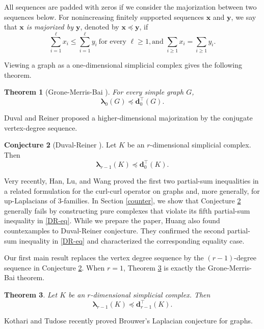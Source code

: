 \documentclass[12pt]{amsart}
\theoremstyle{plain}
\newtheorem{thm}{Theorem}[section]
\theoremstyle{definition}
\newtheorem{conj}[thm]{Conjecture}
\numberwithin{equation}{section}
\numberwithin{figure}{section}
\newcommand{\bflam}{\bm{\lambda}}
\newcommand{\dd}{\mathbf d}
\newcommand{\pre}{\preccurlyeq}
\begin{document}
All sequences are padded with zeros if we consider the majorization between two sequences below.
For nonincreasing finitely supported sequences $\mathbf{x}$ and $\mathbf{y}$, we say that \emph{$\mathbf{x}$ is majorized by $\mathbf{y}$}, denoted by $\mathbf{x} \pre \mathbf{y}$, if
\[
\sum_{i = 1}^{\ell} x_i \leq \sum_{i = 1}^{\ell} y_i
~ \text{for every $\ell \geq 1$},
 \text{and~}
\sum_{i \geq 1} x_i = \sum_{i \geq 1} y_i.
\]

Viewing a graph as a one-dimensional simplicial complex gives the following theorem.

\begin{thm}[Grone-Merris-Bai \cite{B2011, GM1994}]\label{gmb}
For every simple graph $G$,
\[
\bflam_{0}(G) \pre \dd_0^\top(G).
\]
\end{thm}

Duval and Reiner proposed a higher-dimensional majorization by the conjugate vertex-degree sequence.

\begin{conj}[Duval-Reiner \cite{DR2002}]\label{dr}
Let $K$ be an $r$-dimensional simplicial complex.
Then
\begin{equation}\label{DR-eq}
\bflam_{r-1}(K) \pre \dd_0^\top(K).
\end{equation}
\end{conj}

Very recently, Han, Lu, and Wang \cite{HLW2026} proved the first two partial-sum inequalities in a related formulation for the curl-curl operator on graphs and, more generally, for up-Laplacians of $3$-families.
In Section \ref{counter}, we show that Conjecture \ref{dr} generally fails by constructing pure complexes that violate its fifth partial-sum inequality in \eqref{DR-eq}.
While we prepare the paper, Huang \cite{Huang} also found countexamples to Duval-Reiner conjecture.
They confirmed the second partial-sum inequality in \eqref{DR-eq} and characterized the corresponding equality case. 


Our first main result replaces the vertex degree sequence by the $(r-1)$-degree sequence in Conjecture \ref{dr}.
When $r=1$, Theorem \ref{main-gm} is exactly the Grone-Merris-Bai theorem.

\begin{thm}\label{main-gm}
Let $K$ be an $r$-dimensional simplicial complex.
Then
\[
\bflam_{r-1}(K) \pre \dd_{r-1}^\top(K).
\]
\end{thm}


Kothari and Tudose recently proved Brouwer's Laplacian conjecture for graphs.
\end{document}
